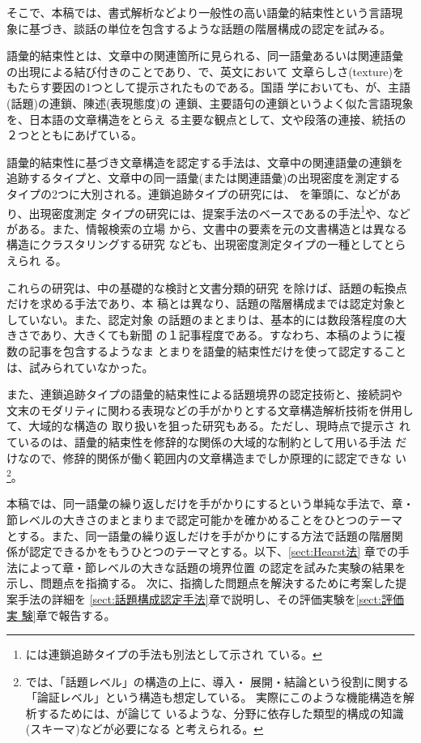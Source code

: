 そこで、本稿では、書式解析などより一般性の高い語彙的結束性という言語現
象に基づき、談話の単位を包含するような話題の階層構成の認定を試みる。

語彙的結束性とは、文章中の関連箇所に見られる、同一語彙あるいは関連語彙
の出現による結び付きのことであり、\cite{Haliday.M-76}で、英文において
文章らしさ(texture)をもたらす要因の1つとして提示されたものである。国語
学においても、\cite{Nagano.M-86}が、主語(話題)の連鎖、陳述(表現態度)の
連鎖、主要語句の連鎖というよく似た言語現象を、日本語の文章構造をとらえ
る主要な観点として、文や段落の連接、統括の２つとともにあげている。

語彙的結束性に基づき文章構造を認定する手法は、文章中の関連語彙の連鎖を
追跡するタイプと、文章中の同一語彙(または関連語彙)の出現密度を測定する
タイプの2つに大別される。連鎖追跡タイプの研究には、\cite{CL-V17N1P21}
を筆頭に、\cite{NLC93-8,NL-102-4,PNLP-2-P325}などがあり、出現密度測定
タイプの研究には、提案手法のベースである\cite{PACL-32-P9}の手法\footnote{\cite{PACL-32-P9}には連鎖追跡タイプの手法も別法として示され
  ている。}や、\cite{NLC93-7,NLC93-63}などがある。また、情報検索の立場
から、文書中の要素を元の文書構造とは異なる構造にクラスタリングする研究
\cite{HYPERTEXT96-P53}なども、出現密度測定タイプの一種としてとらえられ
る。


これらの研究は、\cite{CL-V17N1P21}中の基礎的な検討と文書分類的研究
\cite{HYPERTEXT96-P53}を除けば、話題の転換点だけを求める手法であり、本
稿とは異なり、話題の階層構成までは認定対象としていない。また、認定対象
の話題のまとまりは、基本的には数段落程度の大きさであり、大きくても新聞
の１記事程度である。すなわち、本稿のように複数の記事を包含するようなま
とまりを語彙的結束性だけを使って認定することは、試みられていなかった。

また、連鎖追跡タイプの語彙的結束性による話題境界の認定技術と、接続詞や
文末のモダリティに関わる表現などの手がかりとする文章構造解析技術\cite
[など]{NL-78-15,J78-D-II-N3P511,LIS-N31P25}を併用して、大域的な構造の
取り扱いを狙った研究\cite{JNLP-V5N1P59}もある。ただし、現時点で提示さ
れているのは、語彙的結束性を修辞的な関係の大域的な制約として用いる手法
だけなので、修辞的関係が働く範囲内の文章構造までしか原理的に認定できな
い\footnote{\cite{JNLP-V5N1P59}では、「話題レベル」の構造の上に、導入・
  展開・結論という役割に関する「論証レベル」という構造も想定している。
  実際にこのような機能構造を解析するためには、\cite{LIS-N30P1}が論じて
  いるような、分野に依存した類型的構成の知識(スキーマ)などが必要になる
  と考えられる。}。



本稿では、同一語彙の繰り返しだけを手がかりにするという単純な手法で、章・
節レベルの大きさのまとまりまで認定可能かを確かめることをひとつのテーマ
とする。また、同一語彙の繰り返しだけを手がかりにする方法で話題の階層関
係が認定できるかをもうひとつのテーマとする。以下、\ref{sect:Hearst法}
章で\cite{PACL-32-P9}の手法によって章・節レベルの大きな話題の境界位置
の認定を試みた実験の結果を示し、問題点を指摘する。
次に、指摘した問題点を解決するために考案した提案手法の詳細を
\ref{sect:話題構成認定手法}章で説明し、その評価実験を\ref{sect:評価実
  験}章で報告する。

